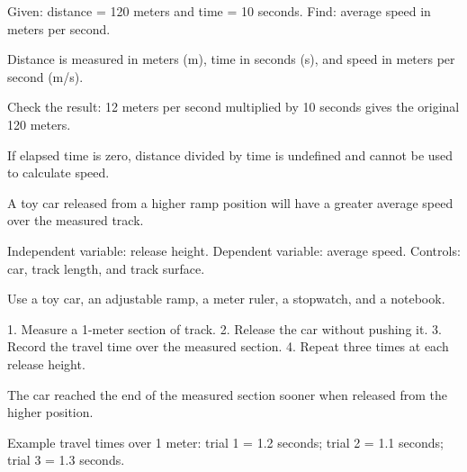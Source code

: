 \documentclass[11pt]{article}
\begin{document}
\begin{givenbox}
Given: distance = 120 meters and time = 10 seconds. Find: average speed in meters per second.
\end{givenbox}

\begin{unitsbox}
Distance is measured in meters (m), time in seconds (s), and speed in meters per second (m/s).
\end{unitsbox}

\begin{checkbox}
Check the result: 12 meters per second multiplied by 10 seconds gives the original 120 meters.
\end{checkbox}

\begin{specialcasebox}
If elapsed time is zero, distance divided by time is undefined and cannot be used to calculate speed.
\end{specialcasebox}

\begin{hypothesisbox}
A toy car released from a higher ramp position will have a greater average speed over the measured track.
\end{hypothesisbox}

\begin{variablesbox}
Independent variable: release height. Dependent variable: average speed. Controls: car, track length, and track surface.
\end{variablesbox}

\begin{equipmentbox}
Use a toy car, an adjustable ramp, a meter ruler, a stopwatch, and a notebook.
\end{equipmentbox}

\begin{procedurebox}
1. Measure a 1-meter section of track.
2. Release the car without pushing it.
3. Record the travel time over the measured section.
4. Repeat three times at each release height.
\end{procedurebox}

\begin{observationbox}
The car reached the end of the measured section sooner when released from the higher position.
\end{observationbox}

\begin{databox}
Example travel times over 1 meter: trial 1 = 1.2 seconds; trial 2 = 1.1 seconds; trial 3 = 1.3 seconds.
\end{databox}
\end{document}
